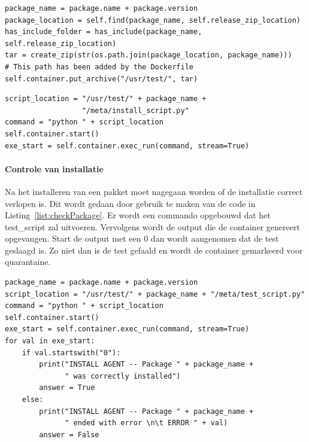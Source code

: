 \begin{minipage}{\linewidth}
\begin{center}
\begin{lstlisting}[caption={Kopieer pakket naar container},label={list:copyPackage}]
package_name = package.name + package.version
package_location = self.find(package_name, self.release_zip_location)
has_include_folder = has_include(package_name, self.release_zip_location)
tar = create_zip(str(os.path.join(package_location, package_name)))
# This path has been added by the Dockerfile
self.container.put_archive("/usr/test/", tar)
\end{lstlisting}
\end{center}
\end{minipage}

\begin{minipage}{\linewidth}
\begin{center}
\begin{lstlisting}[caption={Installatie van een pakket},label={list:installPackage}]
script_location = "/usr/test/" + package_name + 
                  "/meta/install_script.py"
command = "python " + script_location
self.container.start()
exe_start = self.container.exec_run(command, stream=True)
\end{lstlisting}
\end{center}
\end{minipage}

\paragraph{Controle van installatie}
Na het installeren van een pakket moet nagegaan worden of de installatie correct verlopen is.
Dit wordt gedaan door gebruik te maken van de code in Listing~\ref{list:checkPackage}.
Er wordt een commando opgebouwd dat het test\_script zal uitvoeren.
Vervolgens wordt de output die de container genereert opgevangen.
Start de output met een 0 dan wordt aangenomen dat de test geslaagd is.
Zo niet dan is de test gefaald en wordt de container gemarkeerd voor quarantaine.

\begin{minipage}{\linewidth}
\begin{center}
\begin{lstlisting}[caption={Controle van een pakket},label={list:checkPackage}]
package_name = package.name + package.version
script_location = "/usr/test/" + package_name + "/meta/test_script.py"
command = "python " + script_location
self.container.start()
exe_start = self.container.exec_run(command, stream=True)
for val in exe_start:
    if val.startswith("0"):
        print("INSTALL AGENT -- Package " + package_name +
              " was correctly installed")
        answer = True
    else:
        print("INSTALL AGENT -- Package " + package_name +
              " ended with error \n\t ERROR " + val)
        answer = False
\end{lstlisting}
\end{center}
\end{minipage}

